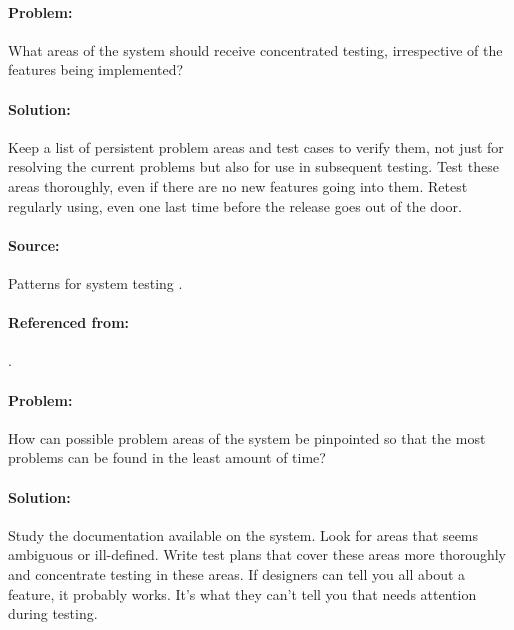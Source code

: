 \documentclass[a4paper,10pt,twoside]{book}
\begin{document}

\paragraph*{Problem:}
What areas of the system should receive concentrated testing, irrespective of the features being implemented?

\paragraph*{Solution:}
Keep a list of persistent problem areas and test cases to verify them, not just for resolving the current problems but also for use in subsequent testing. Test these areas thoroughly, even if there are no new features going into them. Retest regularly using, even one last time before the release goes out of the door. 

\paragraph*{Source:}
Patterns for system testing \cite{DeLa98a}.

\paragraph*{Referenced from:}
.


\paragraph*{Problem:}
How can possible problem areas of the system be pinpointed so that the most problems can be found in the least amount of time?

\paragraph*{Solution:}
Study the documentation available on the system. Look for areas that seems ambiguous or ill-defined. Write test plans that cover these areas more thoroughly and concentrate testing in these areas. If designers can tell you all about a feature, it probably works. It's what they can't tell you that needs attention during testing. 
\end{document}
